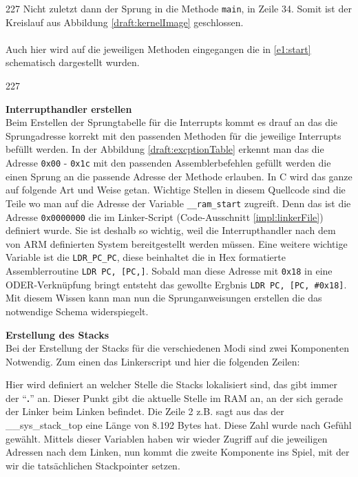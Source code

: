 \begin{dinglist}{227}
Nicht zuletzt dann der Sprung in die Methode \texttt{main}, in Zeile 34. Somit ist der Kreislauf aus Abbildung \ref{draft:kernelImage} geschlossen.\\ \\
Auch hier wird auf die jeweiligen Methoden eingegangen die in 
\ref{e1:start} schematisch dargestellt wurden.
\begin{dinglist}{227}
	\item{\textbf{Interrupthandler erstellen}}\\
	Beim Erstellen der Sprungtabelle f\"ur die Interrupts kommt es drauf an das die Sprungadresse korrekt mit den passenden Methoden f\"ur die jeweilige Interrupts bef\"ullt werden. In der Abbildung \ref{draft:excptionTable} erkennt man das die Adresse \texttt{0x00} - \texttt{0x1c} mit den passenden Assemblerbefehlen gef\"ullt werden die einen Sprung an die passende Adresse der Methode erlauben. In C wird das ganze auf folgende Art und Weise getan.	
Wichtige Stellen in diesem Quellcode sind die Teile wo man auf die Adresse der Variable \texttt{\_\_ram\_start} zugreift. Denn das ist die Adresse \texttt{0x0000000} die im Linker-Script (Code-Ausschnitt \ref{impl:linkerFile}) definiert wurde. Sie ist deshalb so wichtig, weil die Interrupthandler nach dem von ARM definierten System bereitgestellt werden m\"ussen. Eine weitere wichtige Variable ist die \texttt{LDR\_PC\_PC}, diese beinhaltet die in Hex formatierte Assemblerroutine \texttt{LDR PC, [PC,]}. Sobald man diese Adresse mit \texttt{0x18} in eine ODER-Verkn\"upfung bringt entsteht das gewollte Ergbnis \texttt{LDR PC, [PC, \#0x18]}.
Mit diesem Wissen kann man nun die Sprunganweisungen erstellen die das notwendige Schema widerspiegelt.

	\item{\textbf{Erstellung des Stacks}}\\
	Bei der Erstellung der Stacks f\"ur die verschiedenen Modi sind zwei Komponenten Notwendig. Zum einen das Linkerscript und hier die folgenden Zeilen:
	
	Hier wird definiert an welcher Stelle die Stacks lokalisiert sind, das gibt immer der ``\textbf{.}'' an. Dieser Punkt gibt die aktuelle Stelle im RAM an, an der sich gerade der Linker beim Linken befindet. Die Zeile 2 z.B. sagt aus das der \_\_sys\_stack\_top eine L\"ange von 8.192 Bytes hat. Diese Zahl wurde nach Gef\"uhl gew\"ahlt. Mittels dieser Variablen haben wir wieder Zugriff auf die jeweiligen Adressen nach dem Linken, nun kommt die zweite Komponente ins Spiel, mit der wir die tats\"achlichen Stackpointer setzen.	

\end{dinglist}
\end{dinglist}
